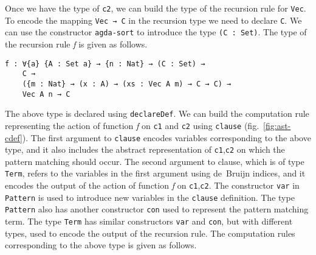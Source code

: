 \documentclass[sigplan,10pt]{acmart}
\begin{document}
Once we have the type of {\tt c2}, we can build the type of the recursion rule for {\tt Vec}. To encode the mapping {\tt Vec → C} in the recursion type we need to declare {\tt C}. We can use the constructor {\tt agda-sort} to introduce the type {\tt (C : Set)}. The type of the recursion rule \emph{f} is given as follows.

\begin{center}
\begingroup
\fontsize{7pt}{2pt}\selectfont
\begin{Verbatim}
f : ∀{a} {A : Set a} → {n : Nat} → (C : Set) → 
    C → 
    ({m : Nat} → (x : A) → (xs : Vec A m) → C → C) → 
    Vec A n → C
\end{Verbatim}
\endgroup
\end{center}

\normalsize


The above type is declared using {\tt declareDef}. We can build the computation rule representing the action of function \emph{f} on {\tt c1} and {\tt c2} using {\tt clause} (fig.~\ref{fig:ast-cdef}). The first argument to {\tt clause} encodes variables corresponding to the above type, and it also includes the abstract representation of {\tt c1},{\tt c2} on which the pattern matching should occur. The second argument to clause, which is of type {\tt Term}, refers to the variables in the first argument using de~Bruijn indices, and it encodes the output of the action of function \emph{f} on {\tt c1},{\tt c2}. The constructor {\tt var} in {\tt Pattern} is used to introduce new variables in the {\tt clause} definition. The type {\tt Pattern} also has another constructor {\tt con} used to represent the pattern matching term. The type {\tt Term} has similar constructors {\tt var} and {\tt con}, but with different types, used to encode the output of the recursion rule. The computation rules corresponding to the above type is given as follows.
\end{document}
